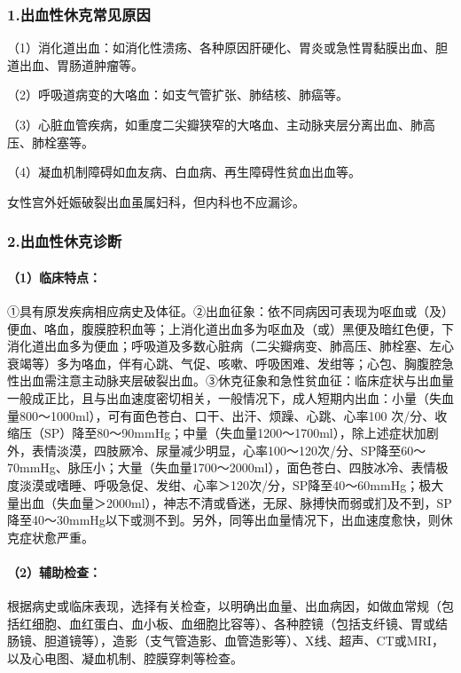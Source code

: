 \subsubsection{1.出血性休克常见原因}

（1）消化道出血：如消化性溃疡、各种原因肝硬化、胃炎或急性胃黏膜出血、胆道出血、胃肠道肿瘤等。

（2）呼吸道病变的大咯血：如支气管扩张、肺结核、肺癌等。

（3）心脏血管疾病，如重度二尖瓣狭窄的大咯血、主动脉夹层分离出血、肺高压、肺栓塞等。

（4）凝血机制障碍如血友病、白血病、再生障碍性贫血出血等。

女性宫外妊娠破裂出血虽属妇科，但内科也不应漏诊。

\subsubsection{2.出血性休克诊断}

\paragraph{（1）临床特点：}

①具有原发疾病相应病史及体征。②出血征象：依不同病因可表现为呕血或（及）便血、咯血，腹膜腔积血等；上消化道出血多为呕血及（或）黑便及暗红色便，下消化道出血多为便血；呼吸道及多数心脏病（二尖瓣病变、肺高压、肺栓塞、左心衰竭等）多为咯血，伴有心跳、气促、咳嗽、呼吸困难、发绀等；心包、胸腹腔急性出血需注意主动脉夹层破裂出血。③休克征象和急性贫血征：临床症状与出血量一般成正比，且与出血速度密切相关，一般情况下，成人短期内出血：小量（失血量800～1000ml），可有面色苍白、口干、出汗、烦躁、心跳、心率100
次/分、收缩压（SP）降至80～90mmHg；中量（失血量1200～1700ml），除上述症状加剧外，表情淡漠，四肢厥冷、尿量减少明显，心率100～120次/分、SP降至60～70mmHg、脉压小；大量（失血量1700～2000ml），面色苍白、四肢冰冷、表情极度淡漠或嗜睡、呼吸急促、发绀、心率＞120次/分，SP降至40～60mmHg；极大量出血（失血量＞2000ml），神志不清或昏迷，无尿、脉搏快而弱或扪及不到，SP降至40～30mmHg以下或测不到。另外，同等出血量情况下，出血速度愈快，则休克症状愈严重。

\paragraph{（2）辅助检查：}

根据病史或临床表现，选择有关检查，以明确出血量、出血病因，如做血常规（包括红细胞、血红蛋白、血小板、血细胞比容等）、各种腔镜（包括支纤镜、胃或结肠镜、胆道镜等），造影（支气管造影、血管造影等）、X线、超声、CT或MRI，以及心电图、凝血机制、腔膜穿刺等检查。

